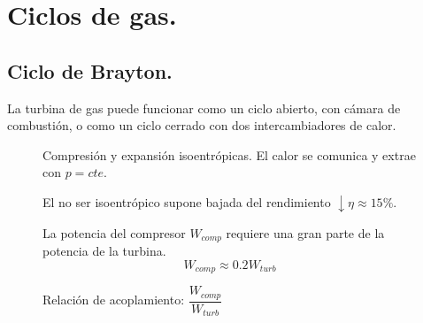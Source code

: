	\section{Ciclos de gas.}
		\subsection{Ciclo de Brayton.}
			La turbina de gas puede funcionar como un ciclo abierto, con cámara de combustión, o como un ciclo cerrado con dos intercambiadores de calor.
			\begin{figure}[H]
				\begin{minipage}{0.4\textwidth}
					Compresión y expansión isoentrópicas. El calor se comunica y extrae con $p = cte$.
					
					\vspace{0.25cm}
					El no ser isoentrópico supone bajada del rendimiento $\downarrow\eta \approx 15\%$.
					
					\vspace{0.25cm}
					La potencia del compresor $W_{comp}$ requiere una gran parte de la potencia de la turbina.
					\[W_{comp} \approx 0.2 W_{turb}\]
					
					\vspace{0.25cm}
					Relación de acoplamiento: $\dfrac{W_{comp}}{W_{turb}}$
					

\end{minipage}
\end{figure}
